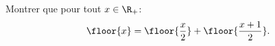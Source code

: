 
\begin{exercice} 
Montrer que pour tout $x\in \R_+$:
$$\floor{x} =\floor{\frac{x}{2} } +\floor{\frac{x+1}{2} }.$$

\end{exercice}